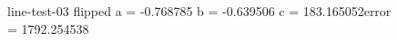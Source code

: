 \begin{figure}
\begin{minipage}[t]{0.32\linewidth}
		\caption{line-test-03 flipped \break a = -0.768785 \break b = -0.639506 \break c =  183.165052\break error = 1792.254538}
	\end{minipage}
	\hfill
	\begin{minipage}[t]{0.32\linewidth}
		\centering

\end{minipage}
\end{figure}
